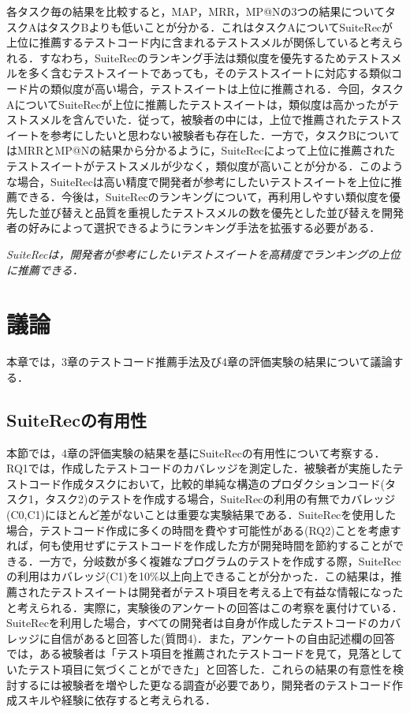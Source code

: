 \documentclass[12pt]{jarticle} %
\begin{document}
各タスク毎の結果を比較すると，MAP，MRR，MP@Nの3つの結果についてタスクAはタスクBよりも低いことが分かる．これはタスクAについて{\sf SuiteRec}が上位に推薦するテストコード内に含まれるテストスメルが関係していると考えられる．すなわち，{\sf SuiteRec}のランキング手法は類似度を優先するためテストスメルを多く含むテストスイートであっても，そのテストスイートに対応する類似コード片の類似度が高い場合，テストスイートは上位に推薦される．今回，タスクAについて{\sf SuiteRec}が上位に推薦したテストスイートは，類似度は高かったがテストスメルを含んでいた．従って，被験者の中には，上位で推薦されたテストスイートを参考にしたいと思わない被験者も存在した．一方で，タスクBについてはMRRとMP@Nの結果から分かるように，{\sf SuiteRec}によって上位に推薦されたテストスイートがテストスメルが少なく，類似度が高いことが分かる．このような場合，{\sf SuiteRec}は高い精度で開発者が参考にしたいテストスイートを上位に推薦できる．今後は，{\sf SuiteRec}のランキングについて，再利用しやすい類似度を優先した並び替えと品質を重視したテストスメルの数を優先とした並び替えを開発者の好みによって選択できるようにランキング手法を拡張する必要がある．

\vspace{\baselineskip}

\begin{breakbox}
\textit{{\sf SuiteRec}は，開発者が参考にしたいテストスイートを高精度でランキングの上位に推薦できる．}
\end{breakbox}


\newpage
\section{議論}

本章では，3章のテストコード推薦手法及び4章の評価実験の結果について議論する．

\subsection{SuiteRecの有用性}
本節では，4章の評価実験の結果を基に{\sf SuiteRec}の有用性について考察する．RQ1では，作成したテストコードのカバレッジを測定した．被験者が実施したテストコード作成タスクにおいて，比較的単純な構造のプロダクションコード(タスク1，タスク2)のテストを作成する場合，{\sf SuiteRec}の利用の有無でカバレッジ(C0,C1)にほとんど差がないことは重要な実験結果である．{\sf SuiteRec}を使用した場合，テストコード作成に多くの時間を費やす可能性がある(RQ2)ことを考慮すれば，何も使用せずにテストコードを作成した方が開発時間を節約することができる．一方で，分岐数が多く複雑なプログラムのテストを作成する際，{\sf SuiteRec}の利用はカバレッジ(C1)を10\%以上向上できることが分かった．この結果は，推薦されたテストスイートは開発者がテスト項目を考える上で有益な情報になったと考えられる．実際に，実験後のアンケートの回答はこの考察を裏付けている．{\sf SuiteRec}を利用した場合，すべての開発者は自身が作成したテストコードのカバレッジに自信があると回答した(質問4)．また，アンケートの自由記述欄の回答では，ある被験者は「テスト項目を推薦されたテストコードを見て，見落としていたテスト項目に気づくことができた」と回答した．これらの結果の有意性を検討するには被験者を増やした更なる調査が必要であり，開発者のテストコード作成スキルや経験に依存すると考えられる．
\end{document}
